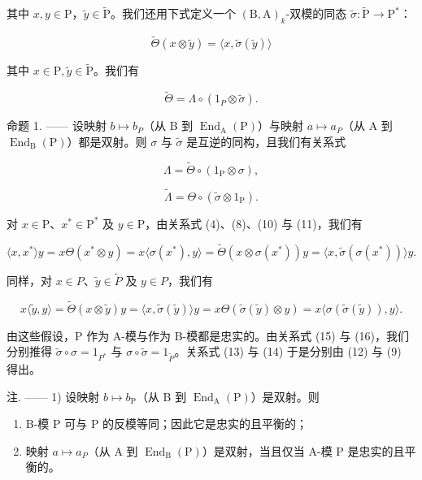 其中 \(x, y \in \mathrm{P}\)，\(\widetilde{y} \in \widetilde{\mathrm{P}}\)。我们还用下式定义一个 \((\mathrm{B}, \mathrm{A})_k\)-双模的同态 \(\widetilde{\sigma}: \widetilde{\mathrm{P}} \to \mathrm{P}^*\)：

\[
\widetilde {\Theta} (x \otimes \widetilde {y}) = \langle x, \widetilde {\sigma} (\widetilde {y}) \rangle\tag{11}
\]

其中 \(x\in \mathrm{P},\widetilde{y}\in \widetilde{\mathrm{P}}\)。我们有

\[
\widetilde {\Theta} = \Lambda \circ (1 _ {P} \otimes \widetilde {\sigma}).\tag{12}
\]

命题 1. —— 设映射 \(b \mapsto b_{P}\)（从 B 到 \(\operatorname{End}_{\mathrm{A}}(\mathrm{P})\)）与映射 \(a \mapsto a_{P}\)（从 A 到 \(\operatorname{End}_{\mathrm{B}}(\mathrm{P})\)）都是双射。则 \(\sigma\) 与 \(\widetilde{\sigma}\) 是互逆的同构，且我们有关系式

\[
\Lambda = \widetilde {\Theta} \circ (1 _ {\mathrm{P}} \otimes \sigma),\tag{13}
\]

\[
\widetilde {\Lambda} = \Theta \circ (\widetilde {\sigma} \otimes 1 _ {\mathrm{P}}).\tag{14}
\]

对 \(x \in \mathrm{P}\)、\(x^{*} \in \mathrm{P}^{*}\) 及 \(y \in \mathrm{P}\)，由关系式 (4)、(8)、(10) 与 (11)，我们有

\[
\langle x, x ^ {*} \rangle y = x \Theta (x ^ {*} \otimes y) = x \langle \sigma (x ^ {*}), y \rangle = \widetilde {\Theta} (x \otimes \sigma (x ^ {*})) y = \langle x, \widetilde {\sigma} (\sigma (x ^ {*})) \rangle y.\tag{15}
\]

同样，对 \(x \in P\)、\(\widetilde{y} \in \widetilde{P}\) 及 \(y \in P\)，我们有

\[
x \langle \widetilde {y}, y \rangle = \widetilde {\Theta} (x \otimes \widetilde {y}) y = \langle x, \widetilde {\sigma} (\widetilde {y}) \rangle y = x \Theta (\widetilde {\sigma} (\widetilde {y}) \otimes y) = x \langle \sigma (\widetilde {\sigma} (\widetilde {y})), y \rangle .\tag{16}
\]

由这些假设，P 作为 A-模与作为 B-模都是忠实的。由关系式 (15) 与 (16)，我们分别推得 \(\widetilde{\sigma} \circ \sigma = 1_{P^{*}}\) 与 \(\sigma \circ \widetilde{\sigma} = 1_{\widetilde{P}}\)。关系式 (13) 与 (14) 于是分别由 (12) 与 (9) 得出。

注. —— 1) 设映射 \(b \mapsto b_{\mathrm{P}}\)（从 B 到 \(\operatorname{End}_{\mathrm{A}}(\mathrm{P})\)）是双射。则

\begin{enumerate}
\def\labelenumi{\alph{enumi})}
\item
  B-模 P 可与 P 的反模等同；因此它是忠实的且平衡的；
\item
  映射 \(a \mapsto a_{P}\)（从 A 到 \(\operatorname{End}_{\mathrm{B}}(\mathrm{P})\)）是双射，当且仅当 A-模 P 是忠实的且平衡的。
\end{enumerate}

